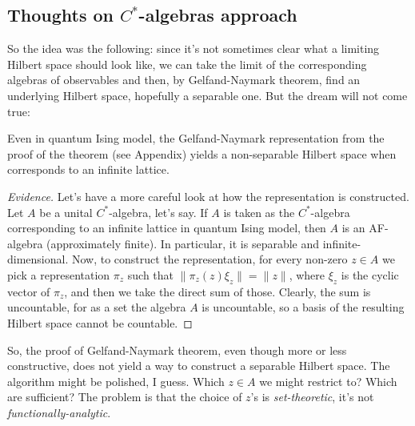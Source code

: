 
%
%

\subsection{Thoughts on $C^*$-algebras approach}
So the idea was the following: since it's not sometimes clear what a limiting Hilbert space should look like, we can take the limit of the corresponding algebras of observables and then, by Gelfand-Naymark theorem, find an underlying Hilbert space, hopefully a separable one. But the dream will not come true:
\begin{statement}
Even in quantum Ising model, the Gelfand-Naymark representation from the proof of the theorem (see Appendix) yields a non-separable Hilbert space when corresponds to an infinite lattice.
\end{statement}
\begin{proof}[Evidence]
Let's have a more careful look at how the representation is constructed. Let $A$ be a unital $C^*$-algebra, let's say. If $A$ is taken as the $C^*$-algebra corresponding to an infinite lattice in quantum Ising model, then $A$ is an AF-algebra (approximately finite). In particular, it is separable and infinite-dimensional. Now, to construct the representation, for every non-zero $z \in A$ we pick a representation $\pi_z$ such that $\|\pi_z(z)\xi_z\| = \|z\|$, where $\xi_z$ is the cyclic vector of $\pi_z$, and then we take the direct sum of those. Clearly, the sum is uncountable, for as a set the algebra $A$ is uncountable, so a basis of the resulting Hilbert space cannot be countable.
\end{proof}
So, the proof of Gelfand-Naymark theorem, even though more or less constructive, does not yield a way to construct a separable Hilbert space. The algorithm might be polished, I guess. Which $z \in A$ we might restrict to? Which are sufficient? The problem is that the choice of $z$'s is \emph{set-theoretic}, it's not \emph{functionally-analytic}. 

